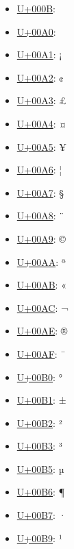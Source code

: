 \begin{itemize}
	\item \href{https://www.compart.com/en/unicode/U+000B}{U+000B}: 
	\item \href{https://www.compart.com/en/unicode/U+00A0}{U+00A0}:  
	\item \href{https://www.compart.com/en/unicode/U+00A1}{U+00A1}: ¡
	\item \href{https://www.compart.com/en/unicode/U+00A2}{U+00A2}: ¢
	\item \href{https://www.compart.com/en/unicode/U+00A3}{U+00A3}: £
	\item \href{https://www.compart.com/en/unicode/U+00A4}{U+00A4}: ¤
	\item \href{https://www.compart.com/en/unicode/U+00A5}{U+00A5}: ¥
	\item \href{https://www.compart.com/en/unicode/U+00A6}{U+00A6}: ¦
	\item \href{https://www.compart.com/en/unicode/U+00A7}{U+00A7}: §
	\item \href{https://www.compart.com/en/unicode/U+00A8}{U+00A8}: ¨
	\item \href{https://www.compart.com/en/unicode/U+00A9}{U+00A9}: ©
	\item \href{https://www.compart.com/en/unicode/U+00AA}{U+00AA}: ª
	\item \href{https://www.compart.com/en/unicode/U+00AB}{U+00AB}: «
	\item \href{https://www.compart.com/en/unicode/U+00AC}{U+00AC}: ¬
	\item \href{https://www.compart.com/en/unicode/U+00AE}{U+00AE}: ®
	\item \href{https://www.compart.com/en/unicode/U+00AF}{U+00AF}: ¯
	\item \href{https://www.compart.com/en/unicode/U+00B0}{U+00B0}: °
	\item \href{https://www.compart.com/en/unicode/U+00B1}{U+00B1}: ±
	\item \href{https://www.compart.com/en/unicode/U+00B2}{U+00B2}: ²
	\item \href{https://www.compart.com/en/unicode/U+00B3}{U+00B3}: ³
	\item \href{https://www.compart.com/en/unicode/U+00B5}{U+00B5}: µ
	\item \href{https://www.compart.com/en/unicode/U+00B6}{U+00B6}: ¶
	\item \href{https://www.compart.com/en/unicode/U+00B7}{U+00B7}: ·
	\item \href{https://www.compart.com/en/unicode/U+00B9}{U+00B9}: ¹

\end{itemize}
